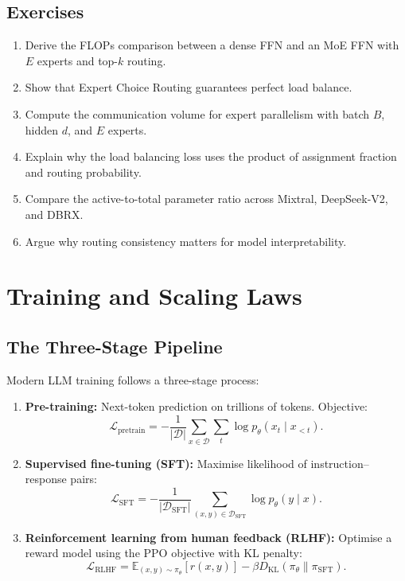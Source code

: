 \documentclass[11pt,a4paper]{book}
\theoremstyle{definition}
\begin{document}
\section{Exercises}

\begin{enumerate}
	\item Derive the FLOPs comparison between a dense FFN and an MoE FFN with $E$ experts and top-$k$ routing.
	\item Show that Expert Choice Routing guarantees perfect load balance.
	\item Compute the communication volume for expert parallelism with batch $B$, hidden $d$, and $E$ experts.
	\item Explain why the load balancing loss uses the product of assignment fraction and routing probability.
	\item Compare the active-to-total parameter ratio across Mixtral, DeepSeek-V2, and DBRX.
	\item Argue why routing consistency matters for model interpretability.
\end{enumerate}

\chapter{Training and Scaling Laws}
\label{ch:training}

\section{The Three-Stage Pipeline}

Modern LLM training follows a three-stage process:

\begin{enumerate}
	\item \textbf{Pre-training:} Next-token prediction on trillions of tokens. Objective:
	      \begin{equation}
		      \mathcal{L}_{\text{pretrain}} = -\frac{1}{|\mathcal{D}|} \sum_{x \in \mathcal{D}} \sum_{t} \log p_\theta(x_t \mid x_{<t}).
	      \end{equation}
	\item \textbf{Supervised fine-tuning (SFT):} Maximise likelihood of instruction--response pairs:
	      \begin{equation}
		      \mathcal{L}_{\text{SFT}} = -\frac{1}{|\mathcal{D}_{\text{SFT}}|} \sum_{(x,y) \in \mathcal{D}_{\text{SFT}}} \log p_\theta(y \mid x).
	      \end{equation}
	\item \textbf{Reinforcement learning from human feedback (RLHF):} Optimise a reward model using the PPO objective with KL penalty:
	      \begin{equation}
		      \mathcal{L}_{\text{RLHF}} = \mathbb{E}_{(x,y) \sim \pi_\theta} [r(x,y)] - \beta D_{\mathrm{KL}}(\pi_\theta \parallel \pi_{\text{SFT}}).
	      \end{equation}
\end{enumerate}
\end{document}
